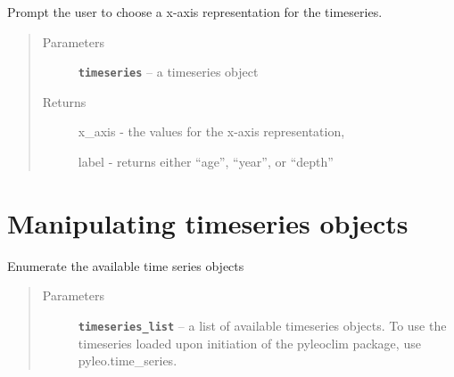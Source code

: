 \documentclass[letterpaper,10pt,english]{sphinxmanual}
\begin{document}

\begin{fulllineitems}
\label{LIPDutils:pyleoclim.xAxisTs}
Prompt the user to choose a x-axis representation for the timeseries.
\begin{quote}\begin{description}
\item[{Parameters}] \leavevmode
\textbf{\texttt{timeseries}} -- a timeseries object

\item[{Returns}] \leavevmode

x\_axis - the values for the x-axis representation,

label - returns either ``age'', ``year'', or ``depth''


\end{description}\end{quote}

\end{fulllineitems}



\section{Manipulating timeseries objects}
\label{LIPDutils:manipulating-timeseries-objects}

\begin{fulllineitems}
\label{LIPDutils:pyleoclim.enumerateTs}
Enumerate the available time series objects
\begin{quote}\begin{description}
\item[{Parameters}] \leavevmode
\textbf{\texttt{timeseries\_list}} -- a  list of available timeseries objects.
To use the timeseries loaded upon initiation of the
pyleoclim package, use pyleo.time\_series.

\end{description}\end{quote}

\end{fulllineitems}

\end{document}
